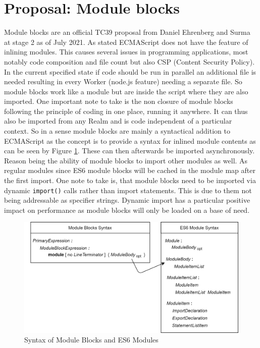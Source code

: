 \section{Proposal: Module blocks}
Module blocks are an official TC39 proposal from Daniel Ehrenberg and Surma at stage 2 as of July 2021. \cite{gitMB} As stated ECMAScript does not have the feature of inlining modules. This causes several issues in programming applications, most notably code composition and file count but also CSP (Content Security Policy). In the current specified state if code should be run in parallel an additional file is needed resulting in every Worker (node.js feature) needing a separate file. So module blocks work like a module but are inside the script where they are also imported. One important note to take is the non closure of module blocks following the principle of coding in one place, running it anywhere. It can thus also be imported from any Realm and is code independent of a particular context. So in a sense module blocks are mainly a syntactical addition to ECMAScript as the concept is to provide a syntax for inlined module contents as can be seen by Figure \ref{fig:mbSyn}. \cite{gitMB, ecma} These can then afterwards be imported asynchronously. Reason being the ability of module blocks to import other modules as well. As regular modules since ES6 module blocks will be cached in the module map after the first import. One note to take is, that module blocks need to be imported via dynamic \texttt{import()} calls rather than import statements. This is due to them not being addressable as specifier strings. Dynamic import  has a particular positive impact on performance as module blocks will only be loaded on a base of need.

\begin{figure}[h!]
    \centering
    \includegraphics[scale=0.165]{figures/ModuleSyntax.png}
    \caption{Syntax of Module Blocks and ES6 Modules}
    \label{fig:mbSyn}
\end{figure}

